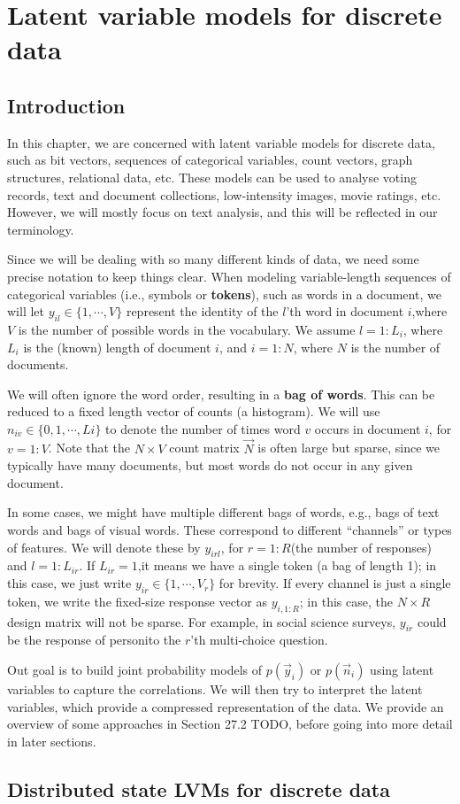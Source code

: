 \chapter{Latent variable models for discrete data}


\section{Introduction}
In this chapter, we are concerned with latent variable models for discrete data, such as bit vectors, sequences of categorical variables, count vectors, graph structures, relational data, etc. These models can be used to analyse voting records, text and document collections, low-intensity images, movie ratings, etc. However, we will mostly focus on text analysis, and this will be reflected in our terminology.

Since we will be dealing with so many different kinds of data, we need some precise notation to keep things clear. When modeling variable-length sequences of categorical variables (i.e., symbols or \textbf{tokens}), such as words in a document, we will let $y_{il} \in \{1,\cdots,V\}$ represent the identity of the $l$'th word in document $i$,where $V$ is the number of possible words in the vocabulary. We assume $l=1:L_i$, where $L_i$ is the (known) length of document $i$, and $i=1:N$, where $N$ is the number of documents.

We will often ignore the word order, resulting in a \textbf{bag of words}. This can be reduced to a fixed length vector of counts (a histogram). We will use $n_{iv} \in \{0,1,\cdots,Li\}$ to denote the number of times word $v$ occurs in document $i$, for $v=1:V$. Note that the $N \times V$ count matrix $\vec{N}$ is often large but sparse, since we typically have many documents, but most words do not occur in any given document.

In some cases, we might have multiple different bags of words, e.g., bags of text words and bags of visual words. These correspond to different “channels” or types of features. We will denote these by $y_{irl}$, for $r=1:R$(the number of responses) and $l=1:L_{ir}$. If $L_{ir} =1$,it means we have a single token (a bag of length 1); in this case, we just write $y_{ir} \in \{1,\cdots,V_r\}$ for brevity. If every channel is just a single token, we write the fixed-size response vector as $y_{i,1:R}$; in this case, the $N \times R$ design matrix  will not be sparse. For example, in social science surveys, $y_{ir}$ could be the response of personito the $r$'th multi-choice question.

Out goal is to build joint probability models of $p(\vec{y}_i)$ or $p(\vec{n}_i)$ using latent variables to capture the correlations. We will then try to interpret the latent variables, which provide a compressed representation of the data. We provide an overview of some approaches in Section 27.2 TODO, before going into more detail in later sections.


\section{Distributed state LVMs for discrete data}

